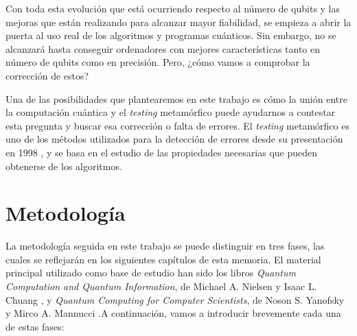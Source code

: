 Con toda esta evolución que está ocurriendo respecto al número de qubits y las mejoras que están realizando para alcanzar mayor fiabilidad, se empieza a abrir la puerta al uso real de los algoritmos y programas cuánticos. Sin embargo, no se alcanzará hasta conseguir ordenadores con mejores características tanto en número de qubits como en precisión. Pero, ¿cómo vamos a comprobar la corrección de estos?

\vspace{10pt}

Una de las posibilidades que plantearemos en este trabajo es cómo la unión entre la computación cuántica y el \textit{testing} metamórfico puede ayudarnos a contestar esta pregunta y buscar esa corrección o falta de errores. El \textit{testing} metamórfico es uno de los métodos utilizados para la detección de errores desde su presentación en 1998 \cite{Note:MT:1998}, y se basa en el estudio de las propiedades necesarias que pueden obtenerse de los algoritmos.

\section{Metodología}
\label{Sec1.1:Metodologia}

La metodología seguida en este trabajo se puede distinguir en tres fases, las cuales se reflejarán en los siguientes capítulos de esta memoria. El material principal utilizado como base de estudio han sido los libros \textit{Quantum Computation and Quantum Information}, de Michael A. Nielsen y Isaac L. Chuang \cite{B:Nielsen:2002}, y \textit{Quantum Computing for Computer Scientists}, de Noson S. Yanofsky y Mirco A. Mannucci \cite{B:QuantumScientist:2008}.A continuación, vamos a introducir brevemente cada una de estas fases: 

